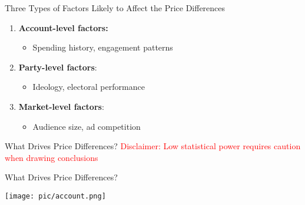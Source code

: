 \documentclass[
  ignorenonframetext,
]{beamer}
\providecommand{\tightlist}{%
  \setlength{\itemsep}{0pt}\setlength{\parskip}{0pt}}
\begin{document}
\begin{frame}{Three Types of Factors Likely to Affect the Price
Differences}
\label{three-types-of-factors-likely-to-affect-the-price-differences}
\begin{enumerate}
\tightlist
\item
  \textbf{Account-level factors:}

  \begin{itemize}
  \tightlist
  \item
    Spending history, engagement patterns
  \end{itemize}
\end{enumerate}

\vspace{.2cm}
\pause

\begin{enumerate}
\setcounter{enumi}{1}
\tightlist
\item
  \textbf{Party-level factors}:

  \begin{itemize}
  \tightlist
  \item
    Ideology, electoral performance
  \end{itemize}
\end{enumerate}

\vspace{.2cm}
\pause

\begin{enumerate}
\setcounter{enumi}{2}
\tightlist
\item
  \textbf{Market-level factors}:

  \begin{itemize}
  \tightlist
  \item
    Audience size, ad competition
  \end{itemize}
\end{enumerate}
\end{frame}

\begin{frame}{What Drives Price Differences?}
\label{what-drives-price-differences}
\Large\textcolor{red}{%
  \faExclamationTriangle\; Disclaimer: Low statistical power requires caution when drawing conclusions \faExclamationTriangle\;
}
\end{frame}

\begin{frame}{What Drives Price Differences?}
\label{what-drives-price-differences-1}
\begin{center}
    \texttt{[image: pic/account.png]}
\end{center}
\end{frame}
\end{document}
